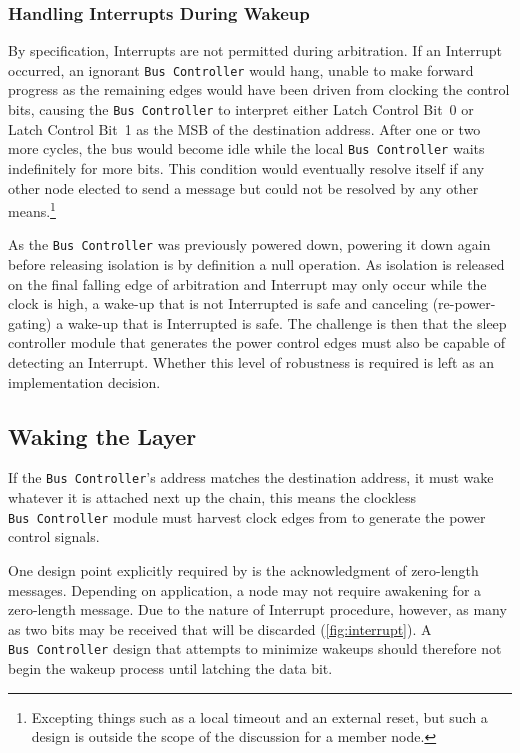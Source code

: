 \subsubsection{Handling Interrupts During Wakeup}
\label{sec:power-bus-controller-wakeup-int}
By specification, Interrupts are not permitted during arbitration. If an
Interrupt occurred, an ignorant {\tt Bus~Controller} would hang, unable to
make forward progress as the remaining edges would have been driven from
clocking the control bits, causing the {\tt Bus~Controller} to interpret
either Latch Control Bit~0 or Latch Control Bit~1 as the MSB of the
destination address. After one or two more cycles, the bus would become idle
while the local {\tt Bus~Controller} waits indefinitely for more bits. This
condition would eventually resolve itself if any other node elected to send a
message but could not be resolved by any other means.\footnote{
  Excepting things such as a local timeout and an external reset, but such
  a design is outside the scope of the discussion for a \bus member node.}

As the {\tt Bus~Controller} was previously powered down, powering it down
again before releasing isolation is by definition a null operation. As
isolation is released on the final falling edge of arbitration and Interrupt
may only occur while the clock is high, a wake-up that is not Interrupted is
safe and canceling (re-power-gating) a wake-up that is Interrupted is safe.
The challenge is then that the sleep controller module that generates the
power control edges must also be capable of detecting an Interrupt. Whether
this level of robustness is required is left as an implementation decision.

\subsection{Waking the Layer}
If the {\tt Bus~Controller}'s address matches the destination address, it must
wake whatever it is attached next up the chain, this means the clockless
{\tt Bus~Controller} module must harvest clock edges from \bus to generate the
power control signals.

One design point explicitly required by \bus is the acknowledgment of
zero-length messages. Depending on application, a node may not require
awakening for a zero-length message. Due to the nature of \bus Interrupt
procedure, however, as many as two bits may be received that will be discarded
(\cref{fig:interrupt}). A {\tt Bus~Controller} design that attempts to
minimize wakeups should therefore not begin the wakeup process until latching
the {\em {}} data bit.

